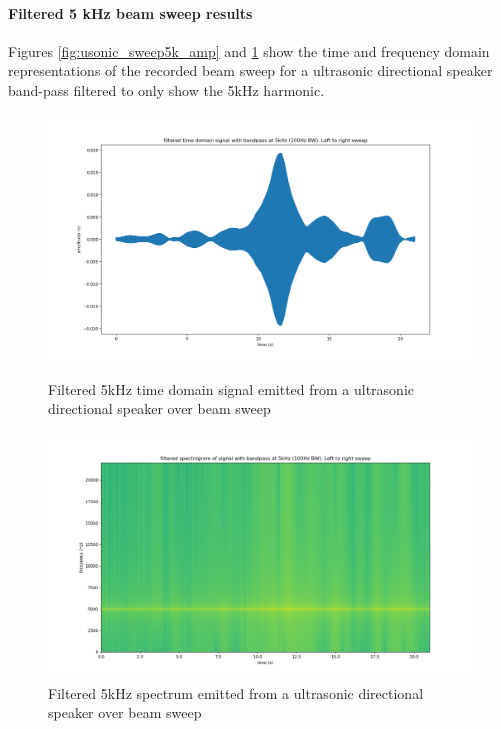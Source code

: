 \paragraph{Filtered 5 kHz beam sweep results}
Figures \ref{fig:usonic_sweep5k_amp} and \ref{fig:usonic_sweep5k_spectro} show the time and frequency domain representations of the recorded beam sweep for a ultrasonic directional speaker band-pass filtered to only show the 5kHz harmonic. 
\begin{figure}[ht!]
    \centering
    \begin{minipage}{0.49\textwidth}
        \centering
        \includegraphics[width=\textwidth]{Figures/Testing/BeamSweep/Ultrasonic_sqr_am/5k_amp_sweep.png}
        \caption{Filtered 5kHz time domain signal emitted from a ultrasonic directional speaker over beam sweep}
        \label{fig:usonic_sweep5k_amp}
    \end{minipage}\hfill
    \begin{minipage}{0.49\textwidth}
        \centering
        \includegraphics[width=\textwidth]{Figures/Testing/BeamSweep/Ultrasonic_sqr_am/5k_freq_sweep.png}
        \caption{Filtered 5kHz spectrum emitted from a ultrasonic directional speaker over beam sweep}
        \label{fig:usonic_sweep5k_spectro}
    \end{minipage}
\end{figure}
